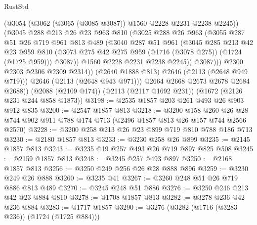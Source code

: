 \begin{lexlean}{RustStd}
\begin{coremodule}
                    (@3054 (@3062 (@3065 (@3085 @3087)) @1560 @2228 @2231 @2238 @2245))
                    (@3045
                      @288
                      @213
                      @26
                      @23
                      @963
                      @810
                      (@3025
                        @288
                        @26
                        @963
                        (@3055
                          @287
                          @51
                          @26
                          @719
                          @961
                          @813
                          @489
                          (@3040
                            @287
                            @51
                            @961
                            (@3045
                              @285
                              @213
                              @42
                              @23
                              @959
                              @810
                              (@3073 @275 @42 @275 @959 (@1716 (@3078 @275)) (@1724 (@1725 @959)))
                              @3087))
                          @1560
                          @2228
                          @2231
                          @2238
                          @2245))
                      @3087)))
                @2300
                @2303
                @2306
                @2309
                @2314))
            (@2640 @1888 @813)
            @2646
            (@2113 (@2648 @949 @719)))
          @2646
          (@2113 (@2648 @943 @971)))
        @2664
        @2668
        @2673
        @2678
        @2684
        @2688))
    (@2088 (@2109 @174))
    (@2113 (@2117 @1692 @231))
    (@1672 (@2126 @231 @244 @858 @1873))
@3198 := @2535 @1857 @203 @261 @493 @26 @903 @912 @835
@3200 := @2547 @1857 @813
@3218 := @3200
    @158
    @260
    @26
    @28
    @744
    @902
    @911
    @788
    @174
    @713
    (@2496 @1857 @813 @26 @157 @744 @2566 @2570)
@3228 := @3200 @258 @213 @26 @23 @899 @719 @810 @788 @186 @713
@3230 := @2180 @1857 @813
@3233 := @3230 @258 @26 @899
@3235 := @2145 @1857 @813
@3243 := @3235 @19 @257 @493 @26 @719 @897 @825 @508
@3245 := @2159 @1857 @813
@3248 := @3245 @257 @493 @897
@3250 := @2168 @1857 @813
@3256 := @3250 @249 @256 @26 @28 @888 @896
@3259 := @3230 @249 @26 @888
@3260 := @3235 @41
@3267 := @3260 @248 @51 @26 @719 @886 @813 @489
@3270 := @3245 @248 @51 @886
@3276 := @3250 @246 @213 @42 @23 @884 @810
@3278 := @1708 @1857 @813
@3282 := @3278 @236 @42 @236 @884
@3283 := @1717 @1857
@3290 := @3276 (@3282 (@1716 (@3283 @236)) (@1724 (@1725 @884)))

\end{coremodule}
\end{lexlean}
